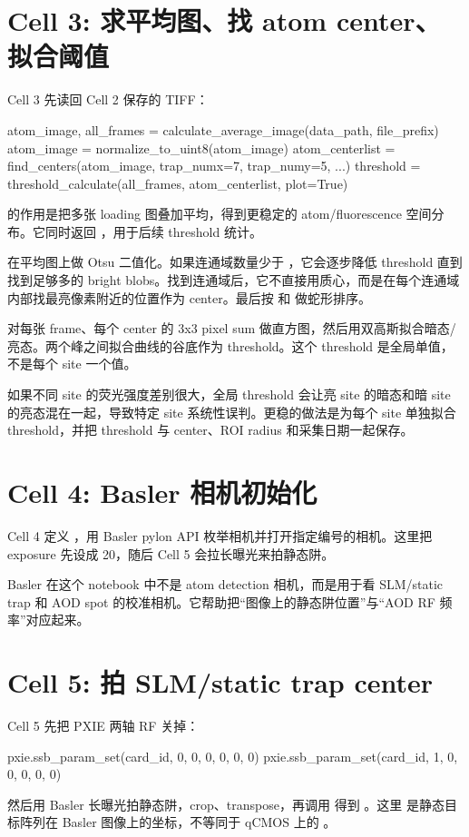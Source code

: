 \documentclass[11pt,oneside,openany]{book}
\begin{document}
\section{Cell 3: 求平均图、找 atom center、拟合阈值}
Cell 3 先读回 Cell 2 保存的 TIFF：
\begin{codeblock}[Python]
atom_image, all_frames = calculate_average_image(data_path, file_prefix)
atom_image = normalize_to_uint8(atom_image)
atom_centerlist = find_centers(atom_image, trap_numx=7, trap_numy=5, ...)
threshold = threshold_calculate(all_frames, atom_centerlist, plot=True)
\end{codeblock}

 的作用是把多张 loading 图叠加平均，得到更稳定的 atom/fluorescence 空间分布。它同时返回 ，用于后续 threshold 统计。

 在平均图上做 Otsu 二值化。如果连通域数量少于 ，它会逐步降低 threshold 直到找到足够多的 bright blobs。找到连通域后，它不直接用质心，而是在每个连通域内部找最亮像素附近的位置作为 center。最后按  和  做蛇形排序。

 对每张 frame、每个 center 的 3x3 pixel sum 做直方图，然后用双高斯拟合暗态/亮态。两个峰之间拟合曲线的谷底作为 threshold。这个 threshold 是全局单值，不是每个 site 一个值。

\begin{notebox}[潜在误差]
如果不同 site 的荧光强度差别很大，全局 threshold 会让亮 site 的暗态和暗 site 的亮态混在一起，导致特定 site 系统性误判。更稳的做法是为每个 site 单独拟合 threshold，并把 threshold 与 center、ROI radius 和采集日期一起保存。
\end{notebox}

\section{Cell 4: Basler 相机初始化}
Cell 4 定义 ，用 Basler pylon API 枚举相机并打开指定编号的相机。这里把 exposure 先设成 20，随后 Cell 5 会拉长曝光来拍静态阱。

Basler 在这个 notebook 中不是 atom detection 相机，而是用于看 SLM/static trap 和 AOD spot 的校准相机。它帮助把“图像上的静态阱位置”与“AOD RF 频率”对应起来。

\section{Cell 5: 拍 SLM/static trap center}
Cell 5 先把 PXIE 两轴 RF 关掉：
\begin{codeblock}[Python]
pxie.ssb_param_set(card_id, 0, 0, 0, 0, 0, 0)
pxie.ssb_param_set(card_id, 1, 0, 0, 0, 0, 0)
\end{codeblock}
然后用 Basler 长曝光拍静态阱，crop、transpose，再调用  得到 。这里  是静态目标阵列在 Basler 图像上的坐标，不等同于 qCMOS 上的 。
\end{document}
